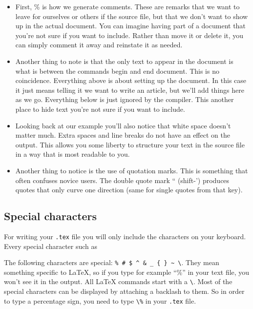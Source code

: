 \begin{itemize}
\item First, \% is how we generate comments. These are remarks that we want to leave for ourselves or others if the source file, but that we don't want to show up in the actual document. You can imagine having part of a document that you're not sure if you want to include. Rather than move it or delete it, you can simply comment it away and reinstate it as needed.
\item Another thing to note is that the only text to appear in the document is what is between the commands begin and end document. This is no coincidence. Everything above \verb|| is about setting up the document. In this case it just means telling it we want to write an article, but we'll add things here as we go. Everything below \verb|| is just ignored by the compiler. This another place to hide text you're not sure if you want to include.
\item Looking back at our example you'll also notice that white space doesn't matter much. Extra spaces and line breaks do not have an effect on the output. This allows you some liberty to structure your text in the source file in a way that is most readable to you.

\item Another thing to notice is the use of quotation marks. This is something that often confuses novice users. The double quote mark `` (shift-') produces quotes that only curve one direction (same for single quotes from that key).
\end{itemize}

\subsection{Special characters}

For writing your \texttt{.tex} file you will only include the characters on your keyboard. Every special character such as %

The following characters are special: \verb|% # $ ^ & _ { } ~ \|. They mean something specific to \LaTeX{}, so if you type for example ``\%'' in your text file, you won't see it in the output. 
All \LaTeX{} commands start with a \verb|\|. Most of the special characters can be displayed by attaching a backlash to them. So in order to type a percentage sign, you need to type \verb|\%| in your \texttt{.tex} file.

